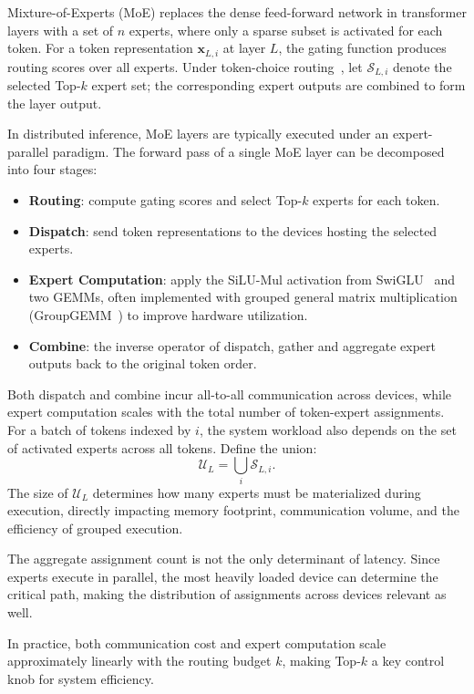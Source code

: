 \documentclass[conference]{IEEEtran}
\theoremstyle{definition} %
\begin{document}
Mixture-of-Experts (MoE) replaces the dense feed-forward network in transformer layers with a set of $n$ experts, where only a sparse subset is activated for each token.
For a token representation $\mathbf{x}_{L,i}$ at layer $L$, the gating function produces routing scores over all experts. Under token-choice routing~\cite{lepikhin2020gshard}, let $\mathcal{S}_{L,i}$ denote the selected Top-$k$ expert set; the corresponding expert outputs are combined to form the layer output.

In distributed inference, MoE layers are typically executed under an expert-parallel paradigm. The forward pass of a single MoE layer can be decomposed into four stages:
\begin{itemize}
    \item \textbf{Routing}: compute gating scores and select Top-$k$ experts for each token.
    \item \textbf{Dispatch}: send token representations to the devices hosting the selected experts.
    \item \textbf{Expert Computation}: apply the SiLU-Mul activation from SwiGLU~\cite{shazeer2020glu} and two GEMMs, often implemented with grouped general matrix multiplication (GroupGEMM~\cite{gale2023megablocks}) to improve hardware utilization.
    \item \textbf{Combine}: the inverse operator of dispatch, gather and aggregate expert outputs back to the original token order.
\end{itemize}

Both dispatch and combine incur all-to-all communication across devices, while expert computation scales with the total number of token-expert assignments.
For a batch of tokens indexed by $i$, the system workload also depends on the set of activated experts across all tokens. Define the union:
\begin{equation*}
\mathcal{U}_L = \bigcup_i \mathcal{S}_{L,i}.
\end{equation*}
The size of $\mathcal{U}_L$ determines how many experts must be materialized during execution, directly impacting memory footprint, communication volume, and the efficiency of grouped execution.

The aggregate assignment count is not the only determinant of latency.
Since experts execute in parallel, the most heavily loaded device can determine the critical path, making the distribution of assignments across devices relevant as well.

In practice, both communication cost and expert computation scale approximately linearly with the routing budget $k$, making Top-$k$ a key control knob for system efficiency.
\end{document}
